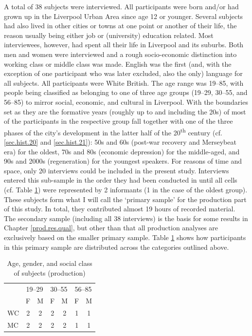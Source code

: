A total of 38 subjects were interviewed.
All participants were born and/or had grown up in the Liverpool Urban Area since age 12 or younger.
Several subjects had also lived in other cities or towns at one point or another of their life, the reason usually being either job or (university) education related.
Most interviewees, however, had spent all their life in Liverpool and its suburbs.
Both men and women were interviewed and a rough socio-economic distinction into working class or middle class was made.
English was the first (and, with the exception of one participant who was later excluded, also the only) language for all subjects.
All participants were White British.
The age range was 19--85, with people being classified as belonging to one of three age groups (19--29, 30--55, and 56--85) to mirror social, economic, and cultural  in Liverpool.
With the boundaries set as they are the formative years (roughly up to and including the 20s) of most of the participants in the respective group fall together with one of the three phases of the city's development in the latter half of the 20\textsuperscript{th} century (cf. \ref{sec.hist.20} and \ref{sec.hist.21}): 50s and 60s (post-war recovery and Merseybeat era) for the oldest, 70s and 80s (economic depression) for the middle-aged, and 90s and 2000s (regeneration) for the youngest speakers.
For reasons of time and space, only 20 interviews could be included in the present study.
Interviews entered this sub-sample in the order they had been conducted in until all cells (cf. Table \ref{tab.participants}) were represented by 2 informants (1 in the case of the oldest group).
These subjects form what I will call the `primary sample' for the production part of this study.
In total, they contributed almost 19 hours of recorded material.
The secondary sample (including all 38 interviews) is the basis for some results in Chapter \ref{prod.res.qual}, but other than that all production analyses are exclusively based on the smaller primary sample.
Table \ref{tab.participants} shows how participants in this primary sample are distributed across the categories outlined above.

	\begin{table}[h]
		\centering
		\caption{Age, gender, and social class of subjects (production)}
		\label{tab.participants}
		\begin{tabular}{lcccccc}
			\hline
			& \multicolumn{2}{c}{19--29} & \multicolumn{2}{c}{30--55} & \multicolumn{2}{c}{56--85}\\
			& F & M & F & M & F & M\\
			\hline
			WC & 2 & 2 & 2 & 2 & 1 & 1\\
			MC & 2 & 2 & 2 & 2 & 1 & 1\\
			\hline
		\end{tabular}
	\end{table}

